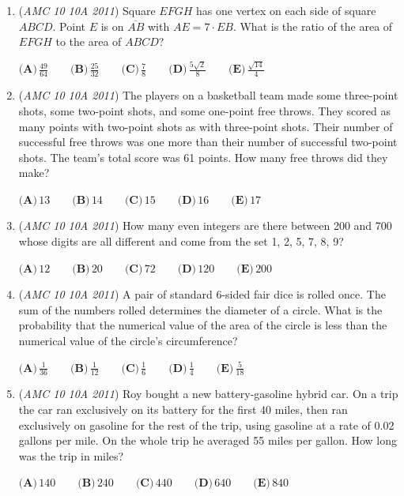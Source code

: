 \begin{enumerate}
	\item (\textit{AMC 10 10A 2011}) Square $EFGH$ has one vertex on each side of square $ABCD$.  Point $E$ is on $\overline{AB}$ with $AE=7\cdot EB$.  What is the ratio of the area of $EFGH$ to the area of $ABCD$?


 $\textbf{(A)}\,\frac{49}{64}     \qquad\textbf{(B)}\,\frac{25}{32}     \qquad\textbf{(C)}\,\frac78 \qquad\textbf{(D)}\,\frac{5\sqrt{2}}{8}   \qquad\textbf{(E)}\,\frac{\sqrt{14}}{4}$


	\item (\textit{AMC 10 10A 2011}) The players on a basketball team made some three-point shots, some two-point shots, and some one-point free throws.  They scored as many points with two-point shots as with three-point shots.  Their number of successful free throws was one more than their number of successful two-point shots.  The team's total score was 61 points.  How many free throws did they make?


 $\textbf{(A)}\,13 \qquad\textbf{(B)}\,14 \qquad\textbf{(C)}\,15 \qquad\textbf{(D)}\,16 \qquad\textbf{(E)}\,17$


	\item (\textit{AMC 10 10A 2011}) How many even integers are there between 200 and 700 whose digits are all different and come from the set {1, 2, 5, 7, 8, 9}?


 $\textbf{(A)}\,12 \qquad\textbf{(B)}\,20 \qquad\textbf{(C)}\,72 \qquad\textbf{(D)}\,120 \qquad\textbf{(E)}\,200$


	\item (\textit{AMC 10 10A 2011}) A pair of standard 6-sided fair dice is rolled once.  The sum of the numbers rolled determines the diameter of a circle.  What is the probability that the numerical value of the area of the circle is less than the numerical value of the circle's circumference?


 $\textbf{(A)}\,\frac{1}{36} \qquad\textbf{(B)}\,\frac{1}{12} \qquad\textbf{(C)}\,\frac{1}{6} \qquad\textbf{(D)}\,\frac{1}{4} \qquad\textbf{(E)}\,\frac{5}{18}$


	\item (\textit{AMC 10 10A 2011}) Roy bought a new battery-gasoline hybrid car. On a trip the car ran exclusively on its battery for the first 40 miles, then ran exclusively on gasoline for the rest of the trip, using gasoline at a rate of 0.02 gallons per mile. On the whole trip he averaged 55 miles per gallon. How long was the trip in miles?


 $\textbf{(A)}\,140 \qquad\textbf{(B)}\,240 \qquad\textbf{(C)}\,440 \qquad\textbf{(D)}\,640 \qquad\textbf{(E)}\,840$



\end{enumerate}
